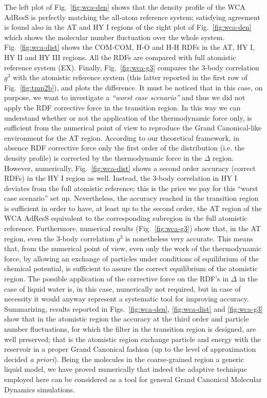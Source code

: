 \documentclass[aip,jcp,a4paper,reprint,onecolumn]{revtex4-1}
\newcommand{\HY}{{\Delta}}
\begin{document}
  The left plot of Fig.~\ref{fig:wca-den} shows that
  the density profile of the
  WCA AdResS is perfectly matching the all-atom reference system; satisfying agreement is found also in the AT and HY I regions of the right plot of Fig.~\ref{fig:wca-den} which shows the molecular
  number fluctuation over the whole system.
Fig.~\ref{fig:wca-dist} shows the COM-COM, H-O and H-H
    RDFs in the AT, HY I, HY II and HY III regions.
    All the RDFs are compared with full atomistic reference system (EX).
    Finally, Fig.~\ref{fig:wca-g3} compares the 3-body correlation $g^3$
    with the atomistic reference
    system (this latter reported in the first row of Fig.~\ref{fig:tmp2b}), and plots the difference. It must be noticed that in this case, on purpose, we want to investigate a {\it ``worst case scenario''} and thus we did not apply the RDF corrective force in the transition region. In this way we can understand whether or not the application of the thermodynamic force only, is sufficient from the numerical point of view to reproduce the Grand Canonical-like environment for the AT region.
    According to our theoretical framework, in absence RDF corrective force only the first order of the distribution (i.e. the density profile)
    is corrected by the thermodynamic force in the $\HY$ region.
    However, numerically, Fig.~\ref{fig:wca-dist} shows a second order accuracy (correct RDFs) in the HY I region as well. Instead, the 3-body
    correlation in HY I deviates from the full atomistic reference; this is the price we pay for this ``worst case scenario'' set up. Nevertheless, the accuracy reached in the transition region is sufficient in order to have, at least up to the second order, the AT region of the WCA AdResS equivalent to the corresponding subregion in the full atomistic reference.
    Furthermore, numerical results  (Fig.~\ref{fig:wca-g3}) show that, in the AT region, even the 3-body correlation $g^3$ is nonetheless very accurate. 
  This means that, from the numerical point of view, even only the work of the thermodynamic force, by allowing an exchange of particles under conditions of equilibrium of the chemical potential, is sufficient to assure the correct equilibrium of the atomistic region. The possible application of the corrective force on the RDF's in $\Delta$ in the case of liquid water is, in this case, numerically not required, but in case of necessity it would anyway represent a systematic tool for improving accuracy. 
  Summarizing, results reported in Figs.~\ref{fig:wca-den}, \ref{fig:wca-dist} and \ref{fig:wca-g3} show that in the atomistic region the accuracy at the third order and particle number fluctuations, for which the filter in the transition region is designed, are well preserved; that is the atomistic region exchange particle and energy with the reservoir in a proper Grand Canonical fashion (up to the level of approximation decided {\it a priori}). Being the molecules in the coarse-grained region a generic liquid model, we have proved numerically that indeed the adaptive technique employed here can be considered as a tool for general Grand Canonical Molecular Dynamics simulations.  
\end{document}
